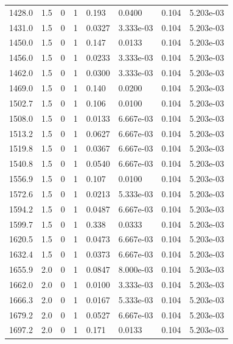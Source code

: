 \documentclass[preview]{standalone}
\begin{document}
{{{{{\begin{tabular}{L{1.2cm}C{1.2cm} C{0.3cm}C{0.5cm} C{1.4cm}C{1.4cm} C{1.4cm}C{1.4cm}}
  1428.0  &   1.5  & 0     &  1 &  0.193  & 0.0400  & 0.104 &  5.203e-03   \\ 
  1431.0  &   1.5  & 0     &  1 &  0.0327  & 3.333e-03  & 0.104 &  5.203e-03   \\ 
  1450.0  &   1.5  & 0     &  1 &  0.147  & 0.0133  & 0.104 &  5.203e-03   \\ 
  1456.0  &   1.5  & 0     &  1 &  0.0233  & 3.333e-03  & 0.104 &  5.203e-03   \\ 
  1462.0  &   1.5  & 0     &  1 &  0.0300  & 3.333e-03  & 0.104 &  5.203e-03   \\ 
  1469.0  &   1.5  & 0     &  1 &  0.140  & 0.0200  & 0.104 &  5.203e-03   \\ 
  1502.7  &   1.5  & 0     &  1 &  0.106  & 0.0100  & 0.104 &  5.203e-03   \\ 
  1508.0  &   1.5  & 0     &  1 &  0.0133  & 6.667e-03  & 0.104 &  5.203e-03   \\ 
  1513.2  &   1.5  & 0     &  1 &  0.0627  & 6.667e-03  & 0.104 &  5.203e-03   \\ 
  1519.8  &   1.5  & 0     &  1 &  0.0367  & 6.667e-03  & 0.104 &  5.203e-03   \\ 
  1540.8  &   1.5  & 0     &  1 &  0.0540  & 6.667e-03  & 0.104 &  5.203e-03   \\ 
  1556.9  &   1.5  & 0     &  1 &  0.107  & 0.0100  & 0.104 &  5.203e-03   \\ 
  1572.6  &   1.5  & 0     &  1 &  0.0213  & 5.333e-03  & 0.104 &  5.203e-03   \\ 
  1594.2  &   1.5  & 0     &  1 &  0.0487  & 6.667e-03  & 0.104 &  5.203e-03   \\ 
  1599.7  &   1.5  & 0     &  1 &  0.338  & 0.0333  & 0.104 &  5.203e-03   \\ 
  1620.5  &   1.5  & 0     &  1 &  0.0473  & 6.667e-03  & 0.104 &  5.203e-03   \\ 
  1632.4  &   1.5  & 0     &  1 &  0.0373  & 6.667e-03  & 0.104 &  5.203e-03   \\ 
  1655.9  &   2.0  & 0     &  1 &  0.0847  & 8.000e-03  & 0.104 &  5.203e-03   \\ 
  1662.0  &   2.0  & 0     &  1 &  0.0100  & 3.333e-03  & 0.104 &  5.203e-03   \\ 
  1666.3  &   2.0  & 0     &  1 &  0.0167  & 5.333e-03  & 0.104 &  5.203e-03   \\ 
  1679.2  &   2.0  & 0     &  1 &  0.0527  & 6.667e-03  & 0.104 &  5.203e-03   \\ 
  1697.2  &   2.0  & 0     &  1 &  0.171  & 0.0133  & 0.104 &  5.203e-03   \\ 

\end{tabular}}}}}}
\end{document}
